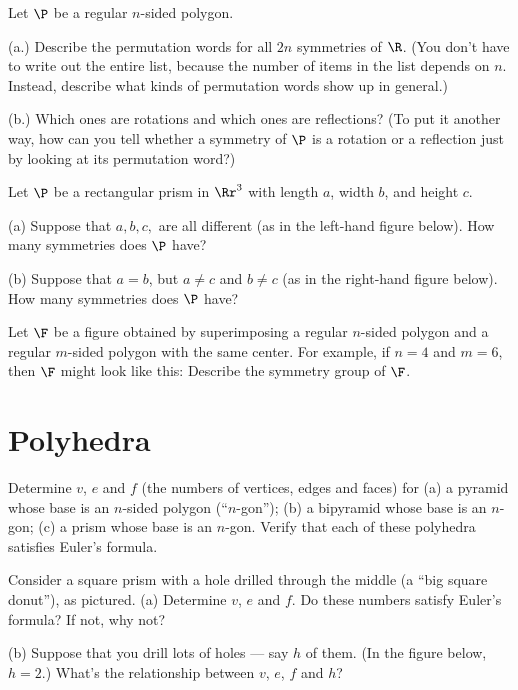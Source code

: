 \begin{TG}
Let $\P$ be a regular $n$-sided polygon.

(a.) Describe the permutation words for all $2n$ symmetries of $\R$.
(You don't have to write out the entire list, because the number
of items in the list depends on $n$.  Instead, describe what
kinds of permutation words show up in general.)

(b.) Which ones are 
rotations and which ones are reflections?  (To put it another way,
how can you tell
whether a symmetry of $\P$ is a rotation or a reflection just by
looking at its permutation word?)
\end{TG}

\pagebreak

\begin{TG}
Let $\P$ be a rectangular prism in $\Rr^3$ with 
length $a$, width $b$, and height $c$.

(a) Suppose that $a,b,c,$  are all
different (as in the left-hand figure below).  How many
symmetries does $\P$ have?

(b) Suppose that $a=b$, but $a\neq c$ and $b\neq c$
(as in the right-hand figure below).  How many
symmetries does $\P$ have?
\end{TG}


\begin{TG}
Let $\F$ be a figure obtained by superimposing a regular $n$-sided
polygon and a regular $m$-sided polygon with the same center.
For example, if $n=4$ and $m=6$, then $\F$ might look like this:
Describe the symmetry group of $\F$.
\end{TG}

\section{Polyhedra}

\begin{PH}
Determine $v$, $e$ and $f$ (the numbers of vertices, edges and faces)
for (a) a pyramid whose
base is an $n$-sided polygon (``$n$-gon''); (b) a bipyramid whose base is an $n$-gon; (c) a prism whose base is an $n$-gon.  Verify that each of
these polyhedra satisfies Euler's formula.
\end{PH}

\begin{PH}
Consider a square prism with
a hole drilled through the middle (a ``big square donut''), as pictured.
(a) Determine $v$, $e$ and $f$.  Do these numbers
satisfy Euler's formula?  If not, why not?

(b) Suppose that you drill lots of holes --- say $h$ of them.
(In the figure below, $h=2$.)
What's the relationship between $v$, $e$, $f$ and $h$?
\end{PH}

